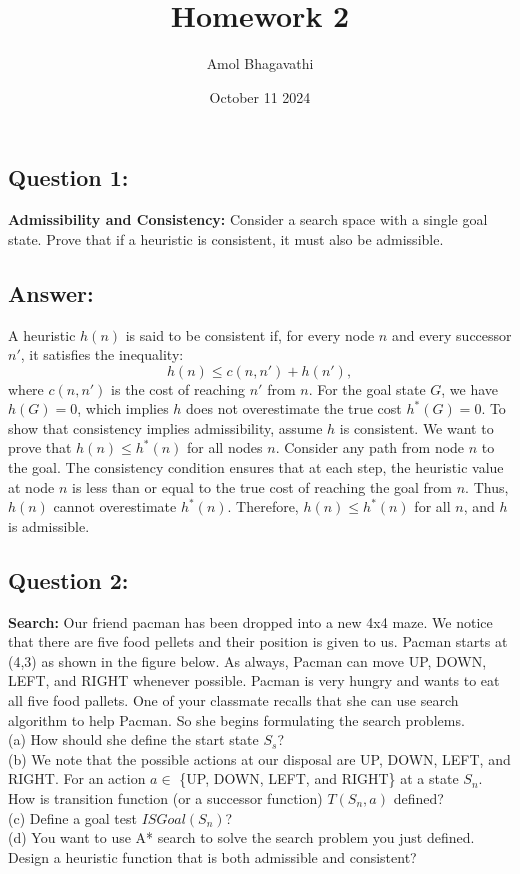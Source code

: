 \documentclass{article}
\title{Homework 2}
\author{Amol Bhagavathi}
\date{October 11 2024}
\begin{document}
\maketitle

\subsection*{Question 1:}
\textbf{Admissibility and Consistency:} Consider a search space with a single goal state. Prove that if a heuristic is consistent, it must also be admissible.
\subsection*{Answer:}
A heuristic \( h(n) \) is said to be consistent if, for every node \( n \) and every successor \( n' \), it satisfies the inequality:
\[
h(n) \leq c(n, n') + h(n'),
\]
where \( c(n, n') \) is the cost of reaching \( n' \) from \( n \). For the goal state \( G \), we have \( h(G) = 0 \), which implies \( h \) does not overestimate the true cost \( h^*(G) = 0 \).
To show that consistency implies admissibility, assume \( h \) is consistent. We want to prove that \( h(n) \leq h^*(n) \) for all nodes \( n \).
Consider any path from node \( n \) to the goal. The consistency condition ensures that at each step, the heuristic value at node \( n \) is less than or equal to the true cost of reaching the goal from \( n \). Thus, \( h(n) \) cannot overestimate \( h^*(n) \).
Therefore, \( h(n) \leq h^*(n) \) for all \( n \), and \( h \) is admissible.

\subsection*{Question 2:}
\textbf{Search:} Our friend pacman has been dropped into a new 4x4 maze. We notice that there are five food pellets and their position is given to us. Pacman starts at (4,3) as shown in the figure below. As always, Pacman can move UP, DOWN, LEFT, and RIGHT whenever possible. Pacman is very hungry and wants to eat all five food pallets. One of your classmate recalls that she can use search algorithm to help Pacman. So she begins formulating the search problems.
\\
(a) How should she define the start state $S_s$?
\\
(b) We note that the possible actions at our disposal are UP, DOWN, LEFT, and RIGHT. For an action $a \in$ \{UP, DOWN, LEFT, and RIGHT\} at a state $S_n$. How is transition function (or a successor function) $T(S_n, a)$ defined?
\\
(c) Define a goal test $ISGoal(S_n)$?
\\
(d) You want to use A* search to solve the search problem you just defined. Design a heuristic function that is both admissible and consistent?
\end{document}

